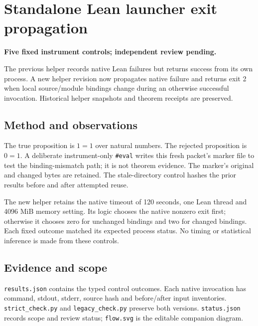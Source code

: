 \documentclass[10pt]{article}
\begin{document}
\section*{Standalone Lean launcher exit propagation}
\textbf{Five fixed instrument controls; independent review pending.}

The previous helper records native Lean failures but returns success from its own process. A new helper revision now propagates native failure and returns exit 2 when local source/module bindings change during an otherwise successful invocation. Historical helper snapshots and theorem receipts are preserved.

\begin{center}\end{center}
\subsection*{Method and observations}
The true proposition is $1=1$ over natural numbers. The rejected proposition is $0=1$. A deliberate instrument-only \texttt{\#eval} writes this fresh packet's marker file to test the binding-mismatch path; it is not theorem evidence. The marker's original and changed bytes are retained. The stale-directory control hashes the prior results before and after attempted reuse.

The new helper retains the native timeout of 120 seconds, one Lean thread and 4096 MiB memory setting. Its logic chooses the native nonzero exit first; otherwise it chooses zero for unchanged bindings and two for changed bindings. Each fixed outcome matched its expected process status. No timing or statistical inference is made from these controls.
\subsection*{Evidence and scope}
\texttt{results.json} contains the typed control outcomes. Each native invocation has command, stdout, stderr, source hash and before/after input inventories. \texttt{strict\_check.py} and \texttt{legacy\_check.py} preserve both versions. \texttt{status.json} records scope and review status; \texttt{flow.svg} is the editable companion diagram.
\end{document}
